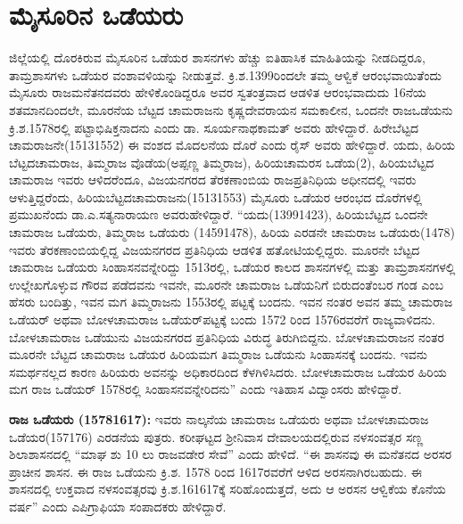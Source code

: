 \section{ಮೈಸೂರಿನ ಒಡೆಯರು}

ಜಿಲ್ಲೆಯಲ್ಲಿ ದೊರಕಿರುವ ಮೈಸೂರಿನ ಒಡೆಯರ ಶಾಸನಗಳು ಹೆಚ್ಚು ಐತಿಹಾಸಿಕ ಮಾಹಿತಿಯನ್ನು ನೀಡದಿದ್ದರೂ, ತಾಮ್ರಶಾಸಗಳು ಒಡೆಯರ ವಂಶಾವಳಿಯನ್ನು ನೀಡುತ್ತವೆ. ಕ್ರಿ.ಶ.1399ರಿಂದಲೇ ತಮ್ಮ ಆಳ್ವಿಕೆ ಆರಂಭವಾಯಿತೆಂದು ಮೈಸೂರು ರಾಜಮನೆತನ\-ದವರು ಹೇಳಿಕೊಂಡಿದ್ದರೂ ಅವರ ಸ್ವತಂತ್ರವಾದ ಆಡಳಿತ ಆರಂಭವಾದುದು 16ನೆಯ ಶತಮಾನದಿಂದಲೇ, ಮೂರನೆಯ ಬೆಟ್ಟದ ಚಾಮರಾಜನು ಕೃಷ್ಣದೇವರಾಯನ ಸಮಕಾಲೀನ, ಒಂದನೇ ರಾಜಒಡೆಯನು ಕ್ರಿ.ಶ.1578ರಲ್ಲಿ ಪಟ್ಟಾಭಿಷಿಕ್ತನಾದನು ಎಂದು ಡಾ. ಸೂರ್ಯನಾಥಕಾಮತ್​ ಅವರು ಹೇಳಿದ್ದಾರೆ. ಹಿರೇಬೆಟ್ಟದ ಚಾಮರಾಜನೇ(15131552) ಈ ವಂಶದ ಮೊದಲನೆಯ ದೊರೆ ಎಂದು ರೈಸ್​ ಅವರು ಹೇಳಿದ್ದಾರೆ. ಯದು, ಹಿರಿಯ ಬೆಟ್ಟದಚಾಮರಾಜ, ತಿಮ್ಮರಾಜ ವೊಡೆಯ(ಅಪ್ಪಣ್ಣ ತಿಮ್ಮರಾಜ), ಹಿರಿಯಚಾಮರಸ ಒಡೆಯ(2), ಹಿರಿಯಬೆಟ್ಟದ ಚಾಮರಾಜ ಇವರು ಆಳಿದರೆಂದೂ, ವಿಜಯನಗರದ ತೆರಕಣಾಂಬಿಯ ರಾಜಪ್ರತಿನಿಧಿಯ ಅಧೀನದಲ್ಲಿ ಇವರು ಆಳುತ್ತಿದ್ದರೆಂದು, ಹಿರಿಯಬೆಟ್ಟದಚಾಮರಾಜನು\break (15131553) ಮೈಸೂರು ಒಡೆಯರ ಆರಂಭದ ದೊರೆಗಳಲ್ಲಿ ಪ್ರಮುಖನೆಂದು ಡಾ.ಎ.ಸತ್ಯನಾರಾಯಣ ಅವರು\break ಹೇಳಿದ್ದಾರೆ. “ಯದು(13991423), ಹಿರಿಯಬೆಟ್ಟದ ಒಂದನೇ ಚಾಮರಾಜ ಒಡೆಯರು, ತಿಮ್ಮರಾಜ ಒಡೆಯರು (14591478), ಹಿರಿಯ ಎರಡನೇ ಚಾಮರಾಜ ಒಡೆಯರು(1478) ಇವರು ತೆರಕಣಾಂಬಿಯಲ್ಲಿದ್ದ ವಿಜಯನಗರದ ಪ್ರತಿನಿಧಿಯ ಆಡಳಿತ ಹತೋಟಿಯಲ್ಲಿದ್ದರು. ಮೂರನೇ ಬೆಟ್ಟದ ಚಾಮರಾಜ ಒಡೆಯರು ಸಿಂಹಾಸನವನ್ನೇರಿದ್ದು 1513ರಲ್ಲಿ, ಒಡೆಯರ ಕಾಲದ ಶಾಸನಗಳಲ್ಲಿ ಮತ್ತು ತಾಮ್ರಶಾಸನಗಳಲ್ಲಿ ಉಲ್ಲೇಖಗೊಳ್ಳುವ ಗೌರವ ಪಡೆದವನು ಇವನೇ, ಮೂರನೇ ಚಾಮರಾಜ ಒಡೆಯನಿಗೆ ಬಿರುದಂತೆಂಬರ ಗಂಡ ಎಂಬ ಹೆಸರು ಬಂದಿತ್ತು, ಇವನ ಮಗ ತಿಮ್ಮರಾಜನು 1553ರಲ್ಲಿ ಪಟ್ಟಕ್ಕೆ ಬಂದನು. ಇವನ ನಂತರ ಅವನ ತಮ್ಮ ಚಾಮರಾಜ ಒಡೆಯರ್​ ಅಥವಾ ಬೋಳಚಾಮರಾಜ ಒಡೆಯರ್​ ಪಟ್ಟಕ್ಕೆ ಬಂದು 1572 ರಿಂದ 1576ರವರೆಗೆ ರಾಜ್ಯವಾಳಿದನು. ಬೋಳಚಾಮರಾಜ ಒಡೆಯುನು ವಿಜಯನಗರದ ಪ್ರತಿನಿಧಿಯ ವಿರುದ್ಧ ತಿರುಗಿಬಿದ್ದನು. ಬೋಳಚಾಮರಾಜನ ನಂತರ ಮೂರನೇ ಬೆಟ್ಟದ ಚಾಮರಾಜ ಒಡೆಯರ ಹಿರಿಯಮಗ ತಿಮ್ಮರಾಜ ಒಡೆಯನು ಸಿಂಹಾಸನಕ್ಕೆ ಬಂದನು. ಇವನು ಸಮರ್ಥನಲ್ಲದ ಕಾರಣ ಹಿರಿಯರು ಅವನನ್ನು ಅಧಿಕಾರದಿಂದ ಕೆಳಗಿಳಿಸಿದರು. ಬೋಳಚಾಮರಾಜ ಒಡೆಯರ ಹಿರಿಯ ಮಗ ರಾಜ ಒಡೆಯರ್​ 1578ರಲ್ಲಿ ಸಿಂಹಾಸನವನ್ನೇರಿದನು” ಎಂದು ಇತಿಹಾಸ ವಿದ್ವಾಂಸರು ಹೇಳಿದ್ದಾರೆ.

\textbf{ ರಾಜ ಒಡೆಯರು (15781617): } ಇವರು ನಾಲ್ಕನೆಯ ಚಾಮರಾಜ ಒಡೆಯರು ಅಥವಾ ಬೋಳಚಾಮರಾಜ ಒಡೆಯರ(157176) ಎರಡನೆಯ ಪುತ್ರರು. ಕರೀಘಟ್ಟದ ಶ‍್ರೀನಿವಾಸ ದೇವಾಲಯದಲ್ಲಿರುವ ನಳಸಂವತ್ಸರ ಸಣ್ಣ ಶಿಲಾಶಾಸನದಲ್ಲಿ “ಮಾಘ ಶು 10 ಲು ರಾಜವಡೇರ ಸೇವೆ” ಎಂದು ಹೇಳಿದೆ. “ಈ ಶಾಸನವು ಈ ಮನೆತನದ ಅರಸರ ಪ್ರಾಚೀನ ಶಾಸನ. ಈ ರಾಜ ಒಡೆಯನು ಕ್ರಿ.ಶ. 1578 ರಿಂದ 1617ರವರೆಗೆ ಆಳಿದ ಅರಸನಾಗಿರಬಹುದು. ಈ ಶಾಸನದಲ್ಲಿ ಉಕ್ತವಾದ ನಳಸಂವತ್ಸರವು ಕ್ರಿ.ಶ.161617ಕ್ಕೆ ಸರಿಹೊಂದುತ್ತದೆ, ಅದು ಆ ಅರಸನ ಆಳ್ವಿಕೆಯ ಕೊನೆಯ ವರ್ಷ” ಎಂದು ಎಪಿಗ್ರಾಫಿಯಾ ಸಂಪಾದಕರು ಹೇಳಿದ್ದಾರೆ. 

